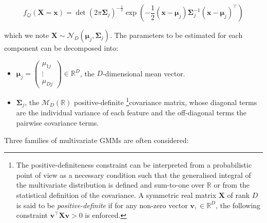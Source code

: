 \begin{equation}
    f_{\zeta j}(\boldsymbol{X}=\boldsymbol{x})=\operatorname{det}(2\pi\boldsymbol{\Sigma}_j)^{-\frac{1}{2}} \exp\left( -\frac{1}{2} (\boldsymbol{x} - \boldsymbol{\mu}_j) \boldsymbol{\Sigma}_j^{-1} (\boldsymbol{x} - \boldsymbol{\mu}_j)^\top\right)
\label{eq:multivariate-distribution}
\end{equation}

which we note
\(\boldsymbol{X} \sim \mathcal{N}_D(\boldsymbol{\mu}_j, \boldsymbol{\Sigma}_j)\). The parameters to be estimated for each component can be decomposed into:

\begin{itemize}
\item
  \(\boldsymbol{\mu}_j=\begin{pmatrix} \mu_{1j} \\ \vdots \\ \mu_{Dj} \end{pmatrix} \in \mathbb{R}^D\), the \(D\)-dimensional mean vector.
\item
  \(\boldsymbol{\Sigma}_j\), the \(\mathcal{M}_D(\mathbb{R})\) positive-definite \footnote{The positive-definiteness constraint can be interpreted from a probabilistic point of view as a necessary condition such that the generalised integral of the multivariate distribution is defined and sum-to-one over \(\mathbb{R}\) or from the statistical definition of the covariance. A symmetric real matrix \(\boldsymbol{X}\) of rank \(D\) is said to be \textit{positive-definite} if for any non-zero vector
    \(\mathbf{v}, \in \mathbb{R}^D\), the following constraint
    \(\mathbf{v}^\top \boldsymbol{X} \mathbf{v} > 0\) is enforced.}covariance matrix, whose diagonal terms are the individual variance of each feature and the off-diagonal terms the pairwise covariance terms.
\end{itemize}

Three families of multivariate GMMs are often considered:

